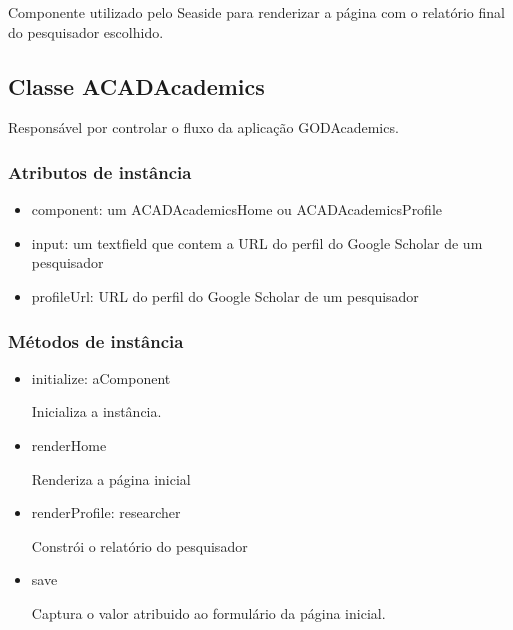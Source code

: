 Componente utilizado pelo Seaside para renderizar a página com o relatório final do pesquisador escolhido.

\subsection{Classe ACADAcademics}

Responsável por controlar o fluxo da aplicação GODAcademics.

\subsubsection{Atributos de instância}

\begin{itemize}
  \item component: um ACADAcademicsHome ou ACADAcademicsProfile

  \item input: um textfield que contem a URL do perfil do Google Scholar de um pesquisador

  \item profileUrl: URL do perfil do Google Scholar de um pesquisador

\end{itemize}

\subsubsection{Métodos de instância}

\begin{itemize}
  \item initialize: aComponent

  Inicializa a instância.

  \item renderHome

  Renderiza a página inicial

  \item renderProfile: researcher

  Constrói o relatório do pesquisador

  \item save

  Captura o valor atribuido ao formulário da página inicial.

\end{itemize}
